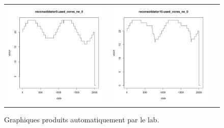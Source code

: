 \documentclass[parallelisme]{compas2017}
\begin{document}
\begin{figure}[h]
	\label{output}
	\caption{Graphiques produits automatiquement par le lab.}
	\begin{tabular}{ccc}
\includegraphics[scale=0.30]{reconsolidator0_used_cores_ne_0}&
\includegraphics[scale=0.30]{reconsolidator10_used_cores_ne_0}&

\end{tabular}
\end{figure}
\end{document}
